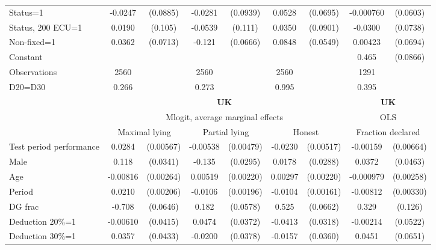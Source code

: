 \begin{tabular}{l|cccccc|cc}
Status=1        &  -0.0247         & (0.0885)&  -0.0281         & (0.0939)&   0.0528         & (0.0695)&-0.000760         & (0.0603)\\
Status, 200 ECU=1&   0.0190         &  (0.105)&  -0.0539         &  (0.111)&   0.0350         & (0.0901)&  -0.0300         & (0.0738)\\
Non-fixed=1     &   0.0362         & (0.0713)&   -0.121\sym{*}  & (0.0666)&   0.0848         & (0.0549)&  0.00423         & (0.0694)\\
Constant        &                  &         &                  &         &                  &         &    0.465\sym{***}& (0.0866)\\
\hline
Observations    &     2560         &         &     2560         &         &     2560         &         &     1291         &         \\
D20=D30         &    0.266         &         &    0.273         &         &    0.995         &         &    0.395         &         \\
\hline\hline
&\multicolumn{6}{c|}{\bf UK}&\multicolumn{2}{c}{\bf UK}\\ &\multicolumn{6}{c|}{Mlogit, average marginal effects }&\multicolumn{2}{c}{OLS}\\
                &\multicolumn{2}{c}{Maximal lying}&\multicolumn{2}{c}{Partial lying}&\multicolumn{2}{c}{Honest}  &\multicolumn{2}{c}{Fraction declared}\\
\hline
Test period performance&   0.0284\sym{***}&(0.00567)& -0.00538         &(0.00479)&  -0.0230\sym{***}&(0.00517)& -0.00159         &(0.00664)\\
Male            &    0.118\sym{***}& (0.0341)&   -0.135\sym{***}& (0.0295)&   0.0178         & (0.0288)&   0.0372         & (0.0463)\\
Age             & -0.00816\sym{***}&(0.00264)&  0.00519\sym{**} &(0.00220)&  0.00297         &(0.00220)&-0.000979         &(0.00258)\\
Period          &   0.0210\sym{***}&(0.00206)&  -0.0106\sym{***}&(0.00196)&  -0.0104\sym{***}&(0.00161)& -0.00812\sym{**} &(0.00330)\\
DG frac         &   -0.708\sym{***}& (0.0646)&    0.182\sym{***}& (0.0578)&    0.525\sym{***}& (0.0662)&    0.329\sym{***}&  (0.126)\\
Deduction 20\%=1& -0.00610         & (0.0415)&   0.0474         & (0.0372)&  -0.0413         & (0.0318)& -0.00214         & (0.0522)\\
Deduction 30\%=1&   0.0357         & (0.0433)&  -0.0200         & (0.0378)&  -0.0157         & (0.0360)&   0.0451         & (0.0651)\\

\end{tabular}
